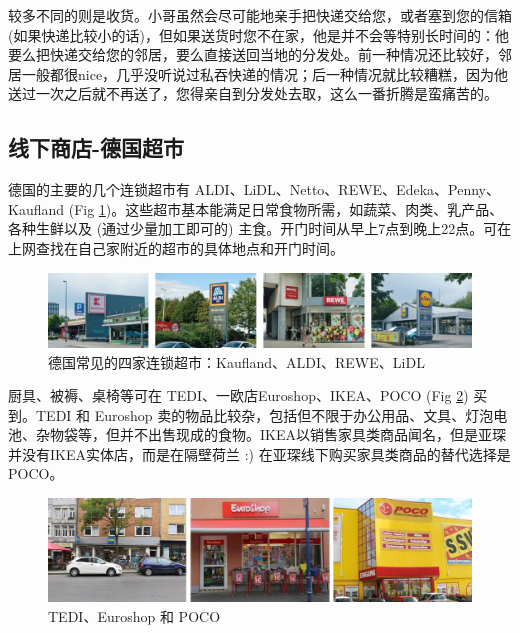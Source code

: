     较多不同的则是收货。小哥虽然会尽可能地亲手把快递交给您，或者塞到您的信箱 (如果快递比较小的话)，但如果送货时您不在家，他是并不会等特别长时间的：他要么把快递交给您的邻居，要么直接送回当地的分发处。前一种情况还比较好，邻居一般都很nice，几乎没听说过私吞快递的情况；后一种情况就比较糟糕，因为他送过一次之后就不再送了，您得亲自到分发处去取，这么一番折腾是蛮痛苦的。

  \subsection{线下商店-德国超市}\label{subsec:线下商店-德国超市}

    德国的主要的几个连锁超市有 ALDI、LiDL、Netto、REWE、Edeka、Penny、Kaufland (Fig \ref{fig:德国常见的四家连锁超市})。这些超市基本能满足日常食物所需，如蔬菜、肉类、乳产品、各种生鲜以及 (通过少量加工即可的) 主食。开门时间从早上7点到晚上22点。可在上网查找在自己家附近的超市的具体地点和开门时间。

    \begin{figure}[ht]
      \centering
      \includegraphics[width=\textwidth]{在亚琛学习和生活/日常消费和饮食/德国超市/德国常见的四家连锁超市：Kaufland、ALDI、REWE、LiDL.png}
      \caption{德国常见的四家连锁超市：Kaufland、ALDI、REWE、LiDL}
      \label{fig:德国常见的四家连锁超市}
    \end{figure}

    厨具、被褥、桌椅等可在 TEDI、一欧店Euroshop、IKEA、POCO (Fig \ref{fig:TEDI、Euroshop 和 POCO}) 买到。TEDI 和 Euroshop 卖的物品比较杂，包括但不限于办公用品、文具、灯泡电池、杂物袋等，但并不出售现成的食物。IKEA以销售家具类商品闻名，但是亚琛并没有IKEA实体店，而是在隔壁荷兰 :) 在亚琛线下购买家具类商品的替代选择是 POCO。

    \begin{figure}[ht]
      \centering
      \includegraphics[width=.8\textwidth]{在亚琛学习和生活/日常消费和饮食/德国超市/TEDI、Euroshop 和 POCO.png}
      \caption{TEDI、Euroshop 和 POCO}
      \label{fig:TEDI、Euroshop 和 POCO}
    \end{figure}


